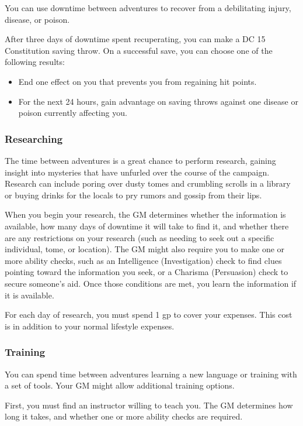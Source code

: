 You can use downtime between adventures to recover from a debilitating injury, disease, or poison.

After three days of downtime spent recuperating, you can make a DC 15 Constitution saving throw. On a successful save, you can choose one of the following results:
\begin{itemize}
    \item End one effect on you that prevents you from regaining hit points.
    \item For the next 24 hours, gain advantage on saving throws against one disease or poison currently affecting you.
\end{itemize}
\subsubsection{Researching}

The time between adventures is a great chance to perform research, gaining insight into mysteries that have unfurled over the course of the campaign. Research can include poring over dusty tomes and crumbling scrolls in a library or buying drinks for the locals to pry rumors and gossip from their lips.

When you begin your research, the GM determines whether the information is available, how many days of downtime it will take to find it, and whether there are any restrictions on your research (such as needing to seek out a specific individual, tome, or location). The GM might also require you to make one or more ability checks, such as an Intelligence (Investigation) check to find clues pointing toward the information you seek, or a Charisma (Persuasion) check to secure someone's aid. Once those conditions are met, you learn the information if it is available.

For each day of research, you must spend 1 gp to cover your expenses. This cost is in addition to your normal lifestyle expenses.

\subsubsection{Training}

You can spend time between adventures learning a new language or training with a set of tools. Your GM might allow additional training options.

First, you must find an instructor willing to teach you. The GM determines how long it takes, and whether one or more ability checks are required.

